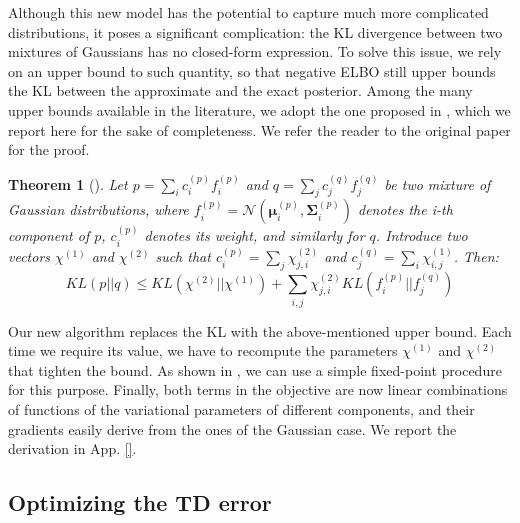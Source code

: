 \documentclass{article}
\newtheorem{theorem}{Theorem}
\begin{document}
Although this new model has the potential to capture much more complicated distributions, it poses a significant complication: the KL divergence between two mixtures of Gaussians has no closed-form expression. To solve this issue, we rely on an upper bound to such quantity, so that negative ELBO still upper bounds the KL between the approximate and the exact posterior. Among the many upper bounds available in the literature, we adopt the one proposed in \cite{hershey2007approximating}, which we report here for the sake of completeness. We refer the reader to the original paper for the proof.
\begin{theorem}[\cite{hershey2007approximating}]\label{th:ukl}
Let $p = \sum_{i} c_i^{(p)} f_i^{(p)}$ and $q = \sum_{j} c_j^{(q)} f_j^{(q)}$ be two mixture of Gaussian distributions, where $f_i^{(p)} = \mathcal{N}(\bm{\mu}_i^{(p)},\bm{\Sigma}_i^{(p)})$ denotes the i-th component of $p$, $c_i^{(p)}$ denotes its weight, and similarly for $q$. Introduce two vectors $\chi^{(1)}$ and $\chi^{(2)}$ such that $c_i^{(p)} = \sum_j \chi^{(2)}_{j,i}$ and $c_j^{(q)} = \sum_i \chi^{(1)}_{i,j}$. Then:
\begin{equation}
KL(p||q) \leq KL(\chi^{(2)}||\chi^{(1)}) + \sum_{i,j} \chi^{(2)}_{j,i}KL(f_i^{(p)}||f_j^{(q)})
\end{equation}
\end{theorem}
Our new algorithm replaces the KL with the above-mentioned upper bound. Each time we require its value, we have to recompute the parameters $\chi^{(1)}$ and $\chi^{(2)}$ that tighten the bound. As shown in \cite{hershey2007approximating}, we can use a simple fixed-point procedure for this purpose. Finally, both terms in the objective are now linear combinations of functions of the variational parameters of different components, and their gradients easily derive from the ones of the Gaussian case. We report the derivation in App. \ref{}.

\subsection{Optimizing the TD error} \label{sec:td}
\end{document}
